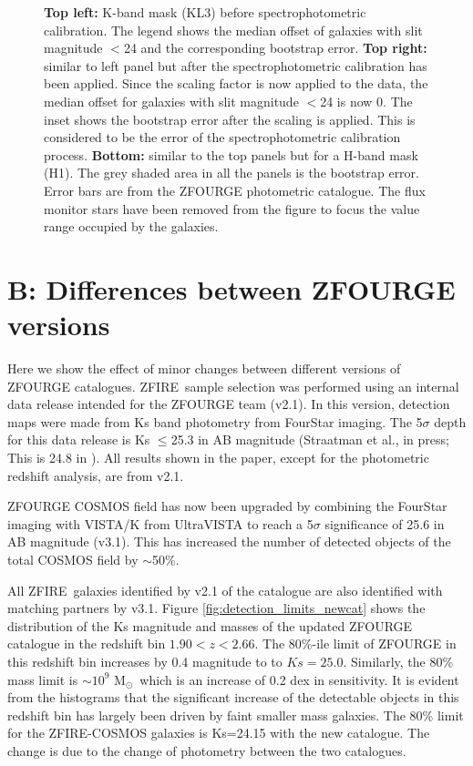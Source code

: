 \documentclass[iop]{emulateapj}
\newcommand{\msol}{M$_\odot$}
\newcommand{\around}{$\sim$}
\begin{document}
\begin{figure}
{{\bf Top left:} K-band mask (KL3) before spectrophotometric calibration. The legend shows the median offset of galaxies with slit magnitude $<$24 and the corresponding bootstrap error.
{\bf Top right:} similar to left panel but after the spectrophotometric calibration has been applied. Since the scaling factor is now applied to the data, the median offset for galaxies with slit magnitude $<$24 is now 0. The inset shows the bootstrap error after the scaling is applied. This is considered to be the error of the spectrophotometric calibration process.
{\bf Bottom:} similar to the top panels but for a H-band mask (H1).
The grey shaded area in all the panels is the bootstrap error.
Error bars are from the ZFOURGE photometric catalogue. The flux monitor stars have been removed from the figure to focus the value range occupied by the galaxies. }
\label{fig:mask_scaling_example}
\end{figure}






\clearpage

\section{B: Differences between ZFOURGE versions}
\label{sec:ZFOURGE comparison}

Here we show the effect of minor changes between different versions of ZFOURGE catalogues. 
ZFIRE\ sample selection was performed using an internal data release intended for the ZFOURGE team (v2.1). In this version, detection maps were made from Ks band photometry from FourStar imaging.
The 5$\sigma$ depth for this data release is Ks $\leq$25.3 in AB magnitude (Straatman et al., in press; This is 24.8 in \citet{Spitler2012}). 
All results shown in the paper, except for the photometric redshift analysis, are from v2.1. 

ZFOURGE COSMOS field has now been upgraded by combining the FourStar imaging with VISTA/K from UltraVISTA \citep{McCracken2012} to reach a 5$\sigma$  significance of 25.6 in AB magnitude (v3.1). This has increased the number of detected objects of the total COSMOS field by \around50\%. 

All ZFIRE\ galaxies identified by v2.1 of the catalogue are also identified with matching partners by v3.1. 
Figure \ref{fig:detection_limits_newcat} shows the distribution of the Ks magnitude and masses of the updated ZFOURGE catalogue in the redshift bin $1.90<z<2.66$. 
The 80\%-ile limit of ZFOURGE in this redshift bin increases by 0.4 magnitude to to $Ks = 25.0$.
Similarly, the 80\% mass limit is \around$10^9$ \msol\ which is an increase of 0.2 dex in sensitivity.  
It is evident from the histograms that the significant increase of the detectable objects in this redshift bin has largely been driven by faint smaller mass galaxies. 
The 80\% limit for the ZFIRE-COSMOS galaxies is Ks=24.15 with the new catalogue. The change is due to the change of photometry between the two catalogues. 
\end{document}
